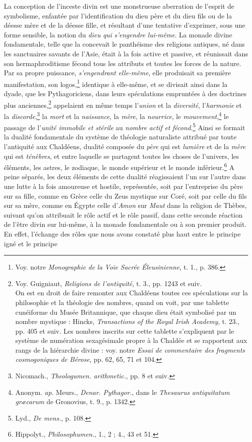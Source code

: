 \documentclass[a4paper, 11pt, oneside, landscape]{article}
\begin{document}
La conception de l'inceste divin est une monstrueuse aberration de l'esprit de symbolisme, enfantée par l'identification du dieu père et du dieu fils ou de la déesse mère et de la déesse fille, et résultant d'une tentative d'exprimer, sous une forme sensible, la notion du \emph{dieu qui s'engendre lui-même}. La monade divine fondamentale, telle que la concevait le panthéisme des religions antiques, né dans les sanctuaires savants de l'Asie, était à la fois active et passive, et réunissait dans son hermaphroditisme fécond tous les attributs et toutes les forces de la nature. Par sa propre puissance, \emph{s'engendrant elle-même}, elle produisait sa première manifestation, son logos,\footnote{Voy. notre \emph{Monographie de la Voie Sacrée Éleusinienne}, t. 1., p. 386.} identique à elle-même, et se divisait ainsi dans la dyade, que les Pythagoriciens, dans leurs spéculations empruntées à des doctrines plus anciennes,\footnote{Voy. Guigniaut, \emph{Religions de l'antiquité}, t. 3., pp. 1243 et suiv.\\\hspace*{5mm}On est en droit de faire remonter aux Chaldéens toutes ces spéculations sur la philosophie et la théologie des nombres, quand on voit, par une tablette cunéiforme du Musée Britannique, que chaque dieu était symbolisé par un nombre mystique : Hincks, \emph{Transactions of the Royal Irish Academy}, t. 23., pp. 405 et suiv. Les nombres inscrits sur cette tablette s'expliquent par le système de numération sexagésimale propre à la Chaldée et se rapportent aux rangs de la hiérarchie divine : voy. notre \emph{Essai de commentaire des fragments cosmogoniques de Bérose}, pp. 62, 65, 71 et 104.} appelaient en même temps l'\emph{union} et la \emph{diversité}, l'\emph{harmonie} et la \emph{discorde},\footnote{Nicomach., \emph{Theologumen. arithmetic.}, pp. 8 et suiv.} la \emph{mort} et la \emph{naissance}, la \emph{mère}, la \emph{nourrice}, le \emph{mouvement},\footnote{Anonym. \emph{ap.} Meurs., \emph{Denar. Pythagor.}, dans le \emph{Thesaurus antiquitatum græcarum} de Gronovius, t. 9., p. 1342.} le passage de l'\emph{unité immobile et stérile} au \emph{nombre actif et fécond}.\footnote{Lyd., \emph{De mens.}, p. 108.} Ainsi se formait la dualité fondamentale du système de théologie naturaliste attribué par toute l'antiquité aux Chaldéens, dualité composée du \emph{père} qui est \emph{lumière} et de la \emph{mère} qui est \emph{ténèbres}, et entre laquelle se partagent toutes les choses de l'univers, les éléments, les astres, le zodiaque, le monde supérieur et le monde inférieur.\footnote{Hippolyt., \emph{Philosophumen.}, 1., 2 ; 4., 43 et 51.} A peine séparés, les deux éléments de cette dualité réagissaient l'un sur l'autre dans une lutte à la fois amoureuse et hostile, représentée, soit par l'entreprise du père sur sa fille, comme en Grèce celle du Zeus mystique sur Coré, soit par celle du fils sur sa mère, comme en Égypte celle d'\emph{Amon} sur \emph{Maut} dans la religion de Thèbes, suivant qu'on attribuait le rôle actif et le rôle passif, dans cette seconde réaction de l'être divin sur lui-même, à la monade fondamentale ou à son premier produit. En effet, l'échange des rôles que nous avons constaté plus haut entre le principe igné et le principe 
\end{document}
